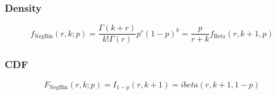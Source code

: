 %
%
%
%




\subsubsection{Density}
\label{NegativBinomialDistributionDensity}

\begin{equation} 
	f_{\text{NegBin}}(r, k; p) = \frac{\Gamma(k+r)}{k! \Gamma(r)} p^r (1-p)^k = \frac{p}{r+k} f_{\text{Beta}}(r,k+1,p)
\end{equation}


\subsubsection{CDF}
\vspace{0.3cm}
\begin{equation} 
	F_{\text{NegBin}}(r, k; p)= I_{1-p}(r,k+1) = ibeta(r,k+1,1-p)
\end{equation}



